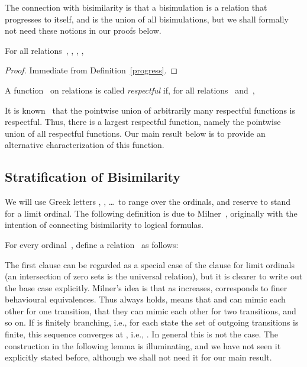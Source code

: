 \documentclass{CSML}
\theoremstyle{definition}
\begin{document}
The connection with bisimilarity is that a bisimulation is a relation
that progresses to itself, and  is the union of all
bisimulations, but we shall formally not need these notions in our
proofs below.

\begin{lem}
\label{progress-monotone}
For all relations~, , , ,

\end{lem}

\begin{proof}
Immediate from Definition~\ref{progress}.
\end{proof}

\begin{defi}[Respectfulness]
\label{respectfulness}
A function~ on relations is called \emph{respectful} if, for all
relations~ and~,

\end{defi}

It is known~\cite{Sangiorgi1998} that the pointwise union of
arbitrarily many respectful functions is respectful.  Thus, there is a
largest respectful function, namely the pointwise union of all
respectful functions.  Our main result below is to provide an
alternative characterization of this function.

\subsection{Stratification of Bisimilarity}

We will use Greek letters , , \ldots\ to range over the
ordinals, and reserve  to stand for a limit ordinal. The
following definition is due to Milner~\cite{Milner1989}, originally
with the intention of connecting bisimilarity to logical formulas.

\begin{defi}
\label{def:stratifications}
For every ordinal~, define a relation~ as
follows:

\end{defi}

The first clause can be regarded as a special case of the clause for
limit ordinals (an intersection of zero sets is the universal
relation), but it is clearer to write out the base case explicitly.
Milner's idea is that as  increases,  corresponds
to finer behavioural equivalences.  Thus  always holds,  means that  and  can mimic each other for one
transition,  that they can mimic each other for two
transitions, and so on.  If  is finitely branching,
i.e., for each state the set of outgoing transitions is finite, this
sequence converges at , i.e., .  In general this is not the case.  The
construction in the following lemma is illuminating, and we have not
seen it explicitly stated before, although we shall not need it for
our main result.
\end{document}

